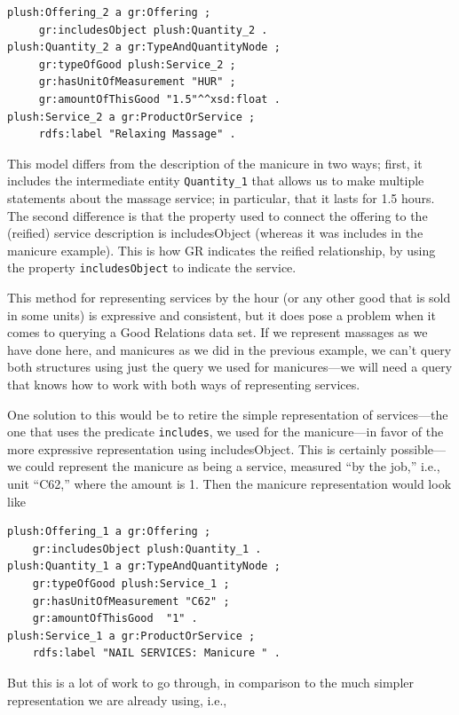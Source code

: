\begin{lstlisting}
plush:Offering_2 a gr:Offering ; 
     gr:includesObject plush:Quantity_2 .
plush:Quantity_2 a gr:TypeAndQuantityNode ; 
     gr:typeOfGood plush:Service_2 ; 
     gr:hasUnitOfMeasurement "HUR" ; 
     gr:amountOfThisGood "1.5"^^xsd:float .
plush:Service_2 a gr:ProductOrService ;
     rdfs:label "Relaxing Massage" .
\end{lstlisting}

This model differs from the description of the manicure in two ways;
first, it includes the intermediate entity \texttt{Quantity\_1} that allows us
to make multiple statements about the massage service; in particular,
that it lasts for 1.5 hours. The second difference is that the property
used to connect the offering to the (reified) service description is
includesObject (whereas it was includes in the manicure example). This
is how GR indicates the reified relationship, by using the property
\texttt{includesObject} to indicate the service.

This method for representing services by the hour (or any other good
that is sold in some units) is
expressive and consistent, but it does pose a problem when it comes to
querying a Good Relations data
set. If we represent massages as we have done here, and manicures as we
did in the previous example, we can't query both structures using just
the query we used for manicures---we will need a query that knows how to
work with both ways of representing services.

One solution to this would be to retire the simple representation of
services---the one that uses the predicate \texttt{includes},  we used for
the manicure---in favor of the more expressive representation using
includesObject. This is certainly possible---we could represent the
manicure as being a service, measured ``by the job,'' i.e., unit
``C62,'' where the amount is 1. Then the manicure representation would
look like

\begin{lstlisting}
plush:Offering_1 a gr:Offering ;
    gr:includesObject plush:Quantity_1 .
plush:Quantity_1 a gr:TypeAndQuantityNode ;
    gr:typeOfGood plush:Service_1 ;
    gr:hasUnitOfMeasurement "C62" ;
    gr:amountOfThisGood  "1" .
plush:Service_1 a gr:ProductOrService ;
    rdfs:label "NAIL SERVICES: Manicure " .
\end{lstlisting}

But this is a lot of work to go through, in comparison to the much
simpler representation we are already using, i.e.,

